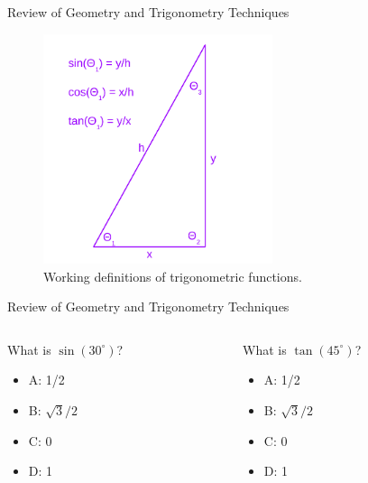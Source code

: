 \documentclass{beamer}
\begin{document}
\begin{frame}{Review of Geometry and Trigonometry Techniques}
\small
\begin{figure}
\centering
\includegraphics[width=0.6\textwidth]{figures/triangles2.pdf}
\caption{\label{fig:triangles2} Working definitions of trigonometric functions.}
\end{figure}
\end{frame}

\begin{frame}{Review of Geometry and Trigonometry Techniques}
\begin{columns}[T]
\begin{column}{0.5\textwidth}
What is $\sin(30^{\circ})$?
\begin{itemize}
\item A: 1/2
\item B: $\sqrt{3}/2$
\item C: 0
\item D: 1
\end{itemize}
\end{column}
\begin{column}{0.5\textwidth}
What is $\tan(45^{\circ})$?
\begin{itemize}
\item A: 1/2
\item B: $\sqrt{3}/2$
\item C: 0
\item D: 1
\end{itemize}
\end{column}
\end{columns}
\end{frame}
\end{document}
